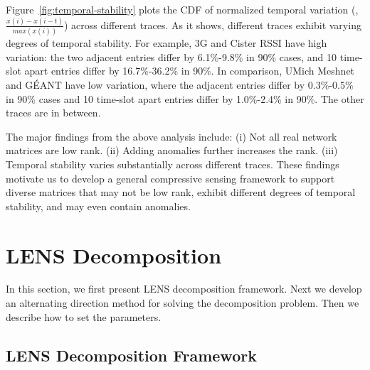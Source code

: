  Figure~\ref{fig:temporal-stability} plots the CDF of
normalized temporal variation (\ie, $\frac{x(i)-x(i-t)}{max(x(i))}$)
across different traces. As it shows, different traces exhibit
varying degrees of temporal stability. For example, 3G and Cister RSSI have
high variation: the two adjacent entries differ by 6.1\%-9.8\% in 90\%
cases, and 10 time-slot apart entries differ by 16.7\%-36.2\% in 90\%. 
In comparison, UMich Meshnet and G\'{E}ANT have low variation, where the adjacent
entries differ by 0.3\%-0.5\% in 90\% cases and 10 time-slot apart
entries differ by 1.0\%-2.4\% in 90\%. The other traces are in between.

 The major findings from the above analysis include: (i) Not
all real network matrices are low rank. (ii) Adding anomalies further
increases the rank. (iii) Temporal stability varies substantially
across different traces. These findings motivate us to develop a
general compressive sensing framework to support diverse matrices that
may not be low rank, exhibit different degrees of temporal stability,
and may even contain anomalies.



\section{LENS Decomposition}
\label{sec:lens}

In this section, we first present LENS decomposition framework. Next we develop
an alternating direction method for solving the decomposition
problem. Then we describe how to set the parameters.

\subsection{LENS Decomposition Framework}
\label{ssec:lens}

